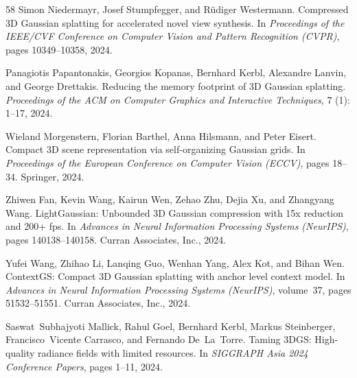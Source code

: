 \documentclass{article}
\begin{document}
\begin{thebibliography}{58}
Simon Niedermayr, Josef Stumpfegger, and R{\"u}diger Westermann.
\newblock Compressed 3{D} {G}aussian splatting for accelerated novel view
  synthesis.
\newblock In \emph{Proceedings of the IEEE/CVF Conference on Computer Vision
  and Pattern Recognition (CVPR)}, pages 10349--10358, 2024.

Panagiotis Papantonakis, Georgios Kopanas, Bernhard Kerbl, Alexandre Lanvin,
  and George Drettakis.
\newblock Reducing the memory footprint of 3{D} {G}aussian splatting.
\newblock \emph{Proceedings of the ACM on Computer Graphics and Interactive
  Techniques}, 7 (1): 1--17, 2024.

Wieland Morgenstern, Florian Barthel, Anna Hilsmann, and Peter Eisert.
\newblock Compact 3{D} scene representation via self-organizing {G}aussian
  grids.
\newblock In \emph{Proceedings of the European Conference on Computer Vision
  (ECCV)}, pages 18--34. Springer, 2024.

Zhiwen Fan, Kevin Wang, Kairun Wen, Zehao Zhu, Dejia Xu, and Zhangyang Wang.
\newblock Light{G}aussian: Unbounded 3{D} {G}aussian compression with 15x
  reduction and 200+ fps.
\newblock In \emph{Advances in Neural Information Processing Systems
  (NeurIPS)}, pages 140138--140158. Curran Associates, Inc., 2024.

Yufei Wang, Zhihao Li, Lanqing Guo, Wenhan Yang, Alex Kot, and Bihan Wen.
\newblock Context{GS}: Compact 3{D} {G}aussian splatting with anchor level
  context model.
\newblock In \emph{Advances in Neural Information Processing Systems
  (NeurIPS)}, volume~37, pages 51532--51551. Curran Associates, Inc., 2024.

Saswat~Subhajyoti Mallick, Rahul Goel, Bernhard Kerbl, Markus Steinberger,
  Francisco~Vicente Carrasco, and Fernando De~La~Torre.
\newblock Taming {3DGS}: High-quality radiance fields with limited resources.
\newblock In \emph{SIGGRAPH Asia 2024 Conference Papers}, pages 1--11, 2024.


\end{thebibliography}
\end{document}
